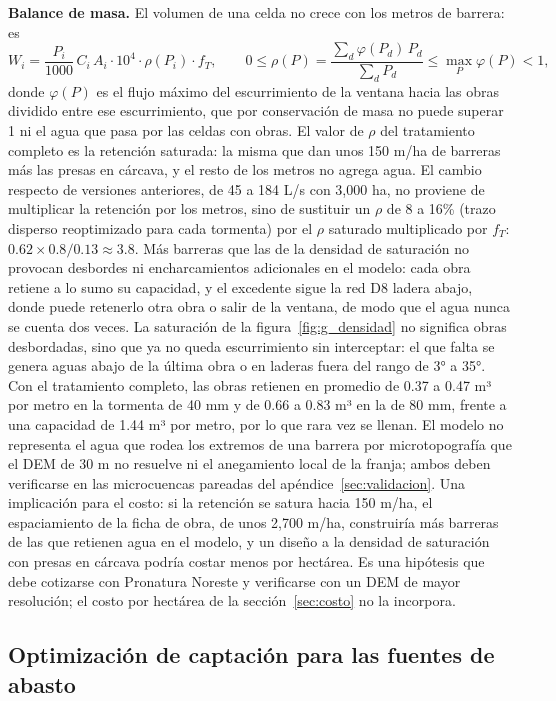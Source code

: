 \documentclass[11pt,letterpaper]{article}
\begin{document}
\textbf{Balance de masa.} El volumen de una celda no crece con los metros de barrera: es
\begin{equation}
W_i = \frac{P_i}{1000}\,C_i\,A_i\cdot 10^4\cdot\rho(P_i)\cdot f_T ,\qquad 0\le \rho(P)=\frac{\sum_d \varphi(P_d)\,P_d}{\sum_d P_d}\le \max_P \varphi(P) < 1,
\end{equation}
donde $\varphi(P)$ es el flujo máximo del escurrimiento de la ventana hacia las obras dividido entre ese escurrimiento, que por conservación de masa no puede superar 1 ni el agua que pasa por las celdas con obras. El valor de $\rho$ del tratamiento completo es la retención saturada: la misma que dan unos 150 m/ha de barreras más las presas en cárcava, y el resto de los metros no agrega agua. El cambio respecto de versiones anteriores, de 45 a 184 L/s con 3,000 ha, no proviene de multiplicar la retención por los metros, sino de sustituir un $\rho$ de 8 a 16\% (trazo disperso reoptimizado para cada tormenta) por el $\rho$ saturado multiplicado por $f_T$: $0.62\times0.8/0.13\approx3.8$. Más barreras que las de la densidad de saturación no provocan desbordes ni encharcamientos adicionales en el modelo: cada obra retiene a lo sumo su capacidad, y el excedente sigue la red D8 ladera abajo, donde puede retenerlo otra obra o salir de la ventana, de modo que el agua nunca se cuenta dos veces. La saturación de la figura~\ref{fig:g_densidad} no significa obras desbordadas, sino que ya no queda escurrimiento sin interceptar: el que falta se genera aguas abajo de la última obra o en laderas fuera del rango de 3° a 35°. Con el tratamiento completo, las obras retienen en promedio de 0.37 a 0.47 m³ por metro en la tormenta de 40 mm y de 0.66 a 0.83 m³ en la de 80 mm, frente a una capacidad de 1.44 m³ por metro, por lo que rara vez se llenan. El modelo no representa el agua que rodea los extremos de una barrera por microtopografía que el DEM de 30 m no resuelve ni el anegamiento local de la franja; ambos deben verificarse en las microcuencas pareadas del apéndice~\ref{sec:validacion}. Una implicación para el costo: si la retención se satura hacia 150 m/ha, el espaciamiento de la ficha de obra, de unos 2,700 m/ha, construiría más barreras de las que retienen agua en el modelo, y un diseño a la densidad de saturación con presas en cárcava podría costar menos por hectárea. Es una hipótesis que debe cotizarse con Pronatura Noreste y verificarse con un DEM de mayor resolución; el costo por hectárea de la sección~\ref{sec:costo} no la incorpora.

\subsection{Optimización de captación para las fuentes de abasto}\label{sec:optim}
\end{document}
